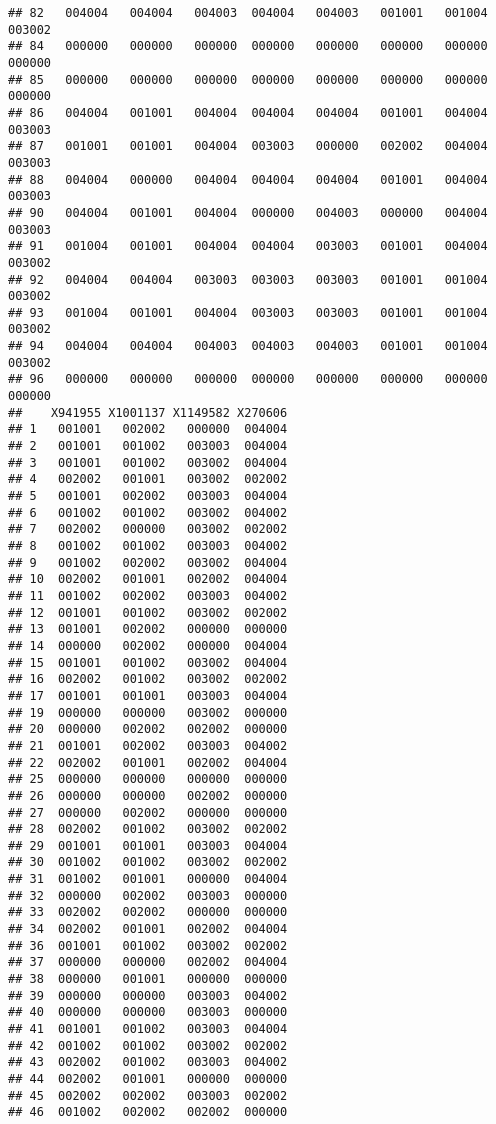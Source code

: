 \documentclass[
]{article}
\begin{document}
\begin{verbatim}
## 82   004004   004004   004003  004004   004003   001001   001004  003002
## 84   000000   000000   000000  000000   000000   000000   000000  000000
## 85   000000   000000   000000  000000   000000   000000   000000  000000
## 86   004004   001001   004004  004004   004004   001001   004004  003003
## 87   001001   001001   004004  003003   000000   002002   004004  003003
## 88   004004   000000   004004  004004   004004   001001   004004  003003
## 90   004004   001001   004004  000000   004003   000000   004004  003003
## 91   001004   001001   004004  004004   003003   001001   004004  003002
## 92   004004   004004   003003  003003   003003   001001   001004  003002
## 93   001004   001001   004004  003003   003003   001001   001004  003002
## 94   004004   004004   004003  004003   004003   001001   001004  003002
## 96   000000   000000   000000  000000   000000   000000   000000  000000
##    X941955 X1001137 X1149582 X270606
## 1   001001   002002   000000  004004
## 2   001001   001002   003003  004004
## 3   001001   001002   003002  004004
## 4   002002   001001   003002  002002
## 5   001001   002002   003003  004004
## 6   001002   001002   003002  004002
## 7   002002   000000   003002  002002
## 8   001002   001002   003003  004002
## 9   001002   002002   003002  004004
## 10  002002   001001   002002  004004
## 11  001002   002002   003003  004002
## 12  001001   001002   003002  002002
## 13  001001   002002   000000  000000
## 14  000000   002002   000000  004004
## 15  001001   001002   003002  004004
## 16  002002   001002   003002  002002
## 17  001001   001001   003003  004004
## 19  000000   000000   003002  000000
## 20  000000   002002   002002  000000
## 21  001001   002002   003003  004002
## 22  002002   001001   002002  004004
## 25  000000   000000   000000  000000
## 26  000000   000000   002002  000000
## 27  000000   002002   000000  000000
## 28  002002   001002   003002  002002
## 29  001001   001001   003003  004004
## 30  001002   001002   003002  002002
## 31  001002   001001   000000  004004
## 32  000000   002002   003003  000000
## 33  002002   002002   000000  000000
## 34  002002   001001   002002  004004
## 36  001001   001002   003002  002002
## 37  000000   000000   002002  004004
## 38  000000   001001   000000  000000
## 39  000000   000000   003003  004002
## 40  000000   000000   003003  000000
## 41  001001   001002   003003  004004
## 42  001002   001002   003002  002002
## 43  002002   001002   003003  004002
## 44  002002   001001   000000  000000
## 45  002002   002002   003003  002002
## 46  001002   002002   002002  000000

\end{verbatim}
\end{document}
